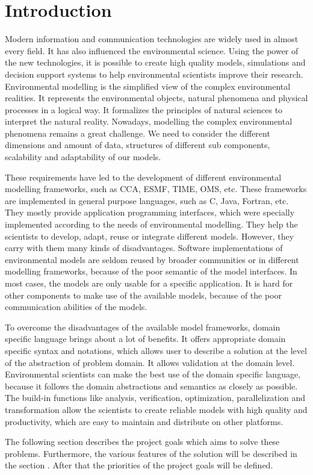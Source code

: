 \chapter{Introduction} \label{chap:introduction}
\par
Modern information and communication technologies are widely used in almost every field.  It has also influenced the environmental science. Using the power of the new technologies, it is possible to create high quality models, simulations and decision support systems to help environmental scientists improve their research. Environmental modelling is the simplified view of the complex environmental realities. It represents the environmental objects, natural phenomena and physical processes in a logical way. It formalizes the principles of natural sciences to interpret the natural reality. Nowadays, modelling the complex environmental phenomena remains a great challenge. We need to consider the different dimensions and amount of data, structures of different sub components, scalability and adaptability of our models.
\par
These requirements have led to the development of different environmental modelling frameworks, such as CCA, ESMF, TIME, OMS, etc. These frameworks are implemented in general purpose languages, such as C, Java, Fortran, etc. They mostly provide application programming interfaces, which were specially implemented according to the needs of environmental modelling. They help the scientists to develop, adapt, reuse or integrate different models. However, they carry with them many kinds of disadvantages. Software implementations of environmental models are seldom reused by broader communities or in different modelling frameworks, because of the poor semantic of the model interfaces. In most cases, the models are only usable for a specific application. It is hard for other components to make use of the available models, because of the poor communication abilities of the models.
\par
To overcome the disadvantages of the available model frameworks, domain specific language brings about a lot of benefits. It offers appropriate domain specific syntax and notations, which allows user to describe a solution at the level of the abstraction of problem domain. It allows validation at the domain level. Environmental scientists can make the best use of the domain specific language, because it follows the domain abstractions and semantics as closely as possible. The build-in functions like analysis, verification, optimization, parallelization and  transformation allow the scientists to create reliable models with high quality and productivity, which are easy to maintain and distribute on other platforms.
\par
The following section describes the project goals which aims to solve these problems. Furthermore, the various features of the solution will be described in the section . After that the priorities of the project goals will be defined.

